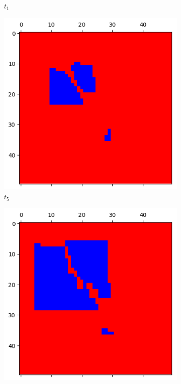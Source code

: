 \documentclass[letterpaper]{article}
\begin{document}
\begin{figure}[H]
\begin{subfigure}{.33\textwidth}
      \caption{$t_{1}$}
    \end{subfigure}
    \begin{subfigure}{.33\textwidth}
      \centering
      \includegraphics[width=1\linewidth]{images/assign2/part31-defect/t5}
      \caption{$t_{5}$}
    \end{subfigure}
    \begin{subfigure}{.33\textwidth}
      \centering
      \includegraphics[width=1\linewidth]{images/assign2/part31-defect/t10}

\end{subfigure}
\end{figure}
\end{document}
